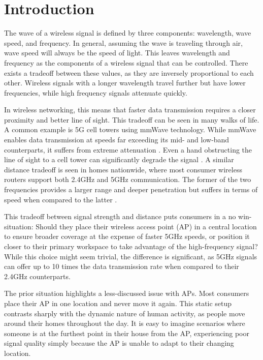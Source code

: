 \section{Introduction}

The wave of a wireless signal is defined by three components: wavelength, wave speed, and frequency. In general, assuming the wave is traveling through air, wave speed will always be the speed of light. This leaves wavelength and frequency as the components of a wireless signal that can be controlled. There exists a tradeoff between these values, as they are inversely proportional to each other. Wireless signals with a longer wavelength travel further but have lower frequencies, while high frequency signals attenuate quickly.

In wireless networking, this means that faster data transmission requires a closer proximity and better line of sight. This tradeoff can be seen in many walks of life. A common example is 5G cell towers using mmWave technology. While mmWave enables data transmission at speeds far exceeding its mid- and low-band counterparts, it suffers from extreme attenuation \cite{mmWaveSurvey}. Even a hand obstructing the line of sight to a cell tower can significantly degrade the signal \cite{handBlock}. A similar distance tradeoff is seen in homes nationwide, where most consumer wireless routers support both 2.4GHz and 5GHz communication. The former of the two frequencies provides a larger range and deeper penetration but suffers in terms of speed when compared to the latter \cite{wirelessPenetration}.

This tradeoff between signal strength and distance puts consumers in a no win-situation: Should they place their wireless access point (AP) in a central location to ensure broader coverage at the expense of faster 5GHz speeds, or position it closer to their primary workspace to take advantage of the high-frequency signal? While this choice might seem trivial, the difference is significant, as 5GHz signals can offer up to 10 times the data transmission rate when compared to their 2.4GHz counterparts.

The prior situation highlights a less-discussed issue with APs. Most consumers place their AP in one location and never move it again. This static setup contrasts sharply with the dynamic nature of human activity, as people move around their homes throughout the day. It is easy to imagine scenarios where someone is at the furthest point in their house from the AP, experiencing poor signal quality simply because the AP is unable to adapt to their changing location.

